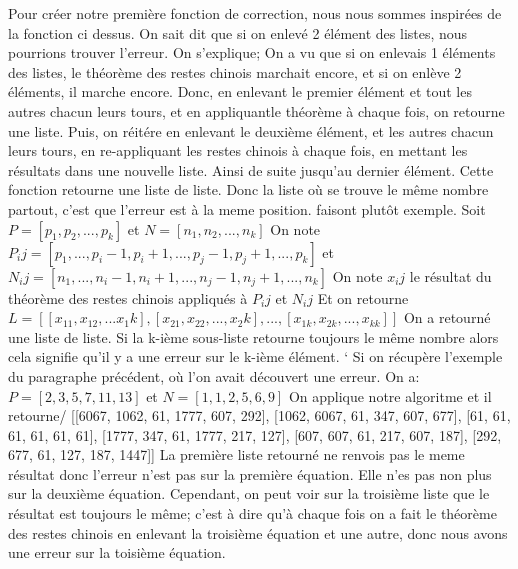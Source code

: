 \documentclass[a4paper, 11pt]{report}
\begin{document}
\newline 
\newline
Pour créer notre première fonction de correction, nous nous sommes inspirées de la fonction ci dessus. On sait dit que si on enlevé 2 élément des listes, nous pourrions trouver l'erreur. On s'explique;
On a vu que si on enlevais 1 éléments des listes, le théorème des restes chinois marchait encore, et si on enlève 2 éléments, il marche encore. Donc, en enlevant le premier élément et tout les autres chacun leurs
tours, et en appliquantle théorème à chaque fois, on retourne une liste. Puis, on réitére en enlevant le deuxième élément, et les autres chacun leurs tours, en re-appliquant les restes chinois à chaque fois, en mettant les résultats dans
une nouvelle liste. Ainsi de suite jusqu'au dernier élément. Cette fonction retourne une liste de liste. Donc la liste où se trouve le même nombre partout, c'est que l'erreur est à la meme position.
faisont plutôt exemple.
\newline 
Soit $P=[p_1, p_2, ... , p_k]$ et $N=[n_1 , n_2, ... ,n_k]$ \newline
On note $P_ij =[p_1 , ... , p_i-1 , p_i+1 , ... , p_j-1 , p_j+1 , ... , p_k]$ et $N_ij=[n_1, ..., n_i-1, n_i+1, ..., n_j-1, n_j+1, ..., n_k]$ \newline
On note $x_ij$ le résultat du théorème des restes chinois appliqués à $P_ij$ et $N_ij$ \newline
Et on retourne $L=[[x_11,x_12,...x_1k],[x_21,x_22,...,x_2k],...,[x_{1k},x_{2k},...,x_{kk}]]$ \newline
On a retourné une liste de liste. Si la k-ième sous-liste retourne toujours le même nombre alors cela signifie qu'il y a une erreur sur le k-ième élément. \newline`
\newline
Si on récupère l'exemple du paragraphe précédent, où l'on avait découvert une erreur. \newline
On a: $P=[2,3,5,7,11,13]$ et $N=[1,1,2,5,6,9]$ \newline
On applique notre algoritme et il retourne/
[[6067, 1062, 61, 1777, 607, 292], [1062, 6067, 61, 347, 607, 677], [61, 61, 61, 61, 61, 61], [1777, 347, 61, 1777, 217, 127], [607, 607, 61, 217, 607, 187], [292, 677, 61, 127, 187, 1447]] \newline
La première liste retourné ne renvois pas le meme résultat donc l'erreur n'est pas sur la première équation. Elle n'es pas non plus sur la deuxième équation.
Cependant, on peut voir sur la troisième liste que le résultat est toujours le même; c'est à dire qu'à chaque fois on a fait le théorème des restes chinois en enlevant la troisième équation et une autre, donc nous avons une erreur sur la toisième équation.
\end{document}
